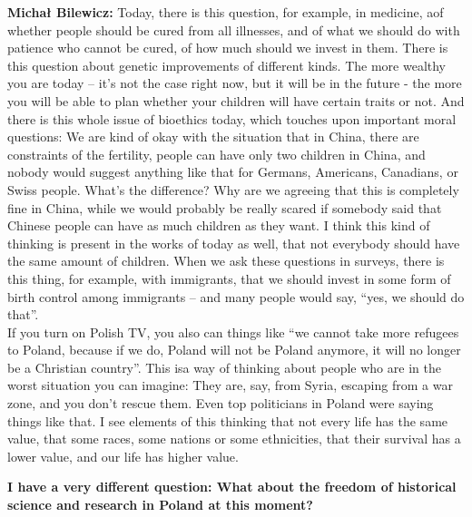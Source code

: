 \textbf{Michał Bilewicz:} Today, there is this question, for example, in medicine, aof whether people should be cured from all illnesses, and of what we should do with patience who cannot be cured, of how much should we invest in them. There is this question about genetic improvements of different kinds. The more wealthy you are today – it’s not the case right now, but it will be in the future -  the more you will be able to plan whether your children will have certain traits or not. And there is this whole issue of bioethics today, which touches upon important moral questions: We are kind of okay with the situation that in China, there are constraints of the fertility, people can have only two children in China, and nobody would suggest anything like that for Germans, Americans, Canadians, or Swiss people. What’s the difference? Why are we agreeing that this is completely fine in China, while we would probably be really scared if somebody said that Chinese people can have as much children as they want. I think this kind of thinking is present in the works of today as well, that not everybody should have the same amount of children. When we ask these questions in surveys, there is this thing, for example, with immigrants, that we should invest in some form of birth control among immigrants – and many people would say, ``yes, we should do that''.\\ If you turn on Polish TV, you also can things like ``we cannot take more refugees to Poland, because if we do, Poland will not be Poland anymore, it will no longer be a Christian country''. This isa way of thinking about people who are in the worst situation you can imagine: They are, say, from Syria, escaping from a war zone, and you don’t rescue them. Even top politicians in Poland were saying things like that. I see elements of this thinking that not every life has the same value, that some races, some nations or some ethnicities, that their survival has a lower value, and our life has higher value.

\textbf{I have a very different question: What about the freedom of historical science and research in Poland at this moment?} 

